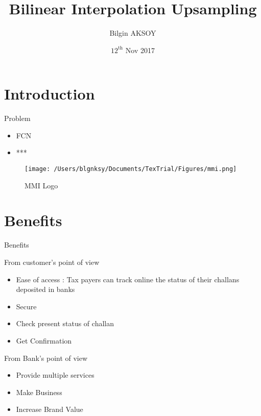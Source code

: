 \documentclass{beamer}
\title[Applied Parallel Programming]{Bilinear Interpolation Upsampling}
\author{Bilgin AKSOY\\}
\institute{\bf Project Phase-I}
\date{$12^{\text{th}}$ Nov 2017}
\begin{document}
\begin{frame}
  \titlepage
\end{frame}

\section{Introduction}

\begin{frame}{Problem}

\begin{itemize}
  \item FCN
  \item ***
\end{itemize}

\begin{figure}
\texttt{[image: /Users/blgnksy/Documents/TexTrial/Figures/mmi.png]}
\caption{\label{fig:mmi_logo}MMI Logo}
\end{figure}
\vskip 1cm

\end{frame}

\section{Benefits}

\begin{frame}{Benefits}

\begin{block}{From customer's point of view}
\end{block}
\begin{itemize}

\item Ease of access : Tax payers can track online the status of their challans deposited in banks
\item Secure
  \item Check present status of challan
  \item Get Confirmation

\end{itemize}

\begin{block}{From Bank's point of view}
\end{block}
\begin{itemize}

\item Provide multiple services
\item Make Business
\item Increase Brand Value
\end{itemize}

\vskip 1cm
\end{frame}
\end{document}
